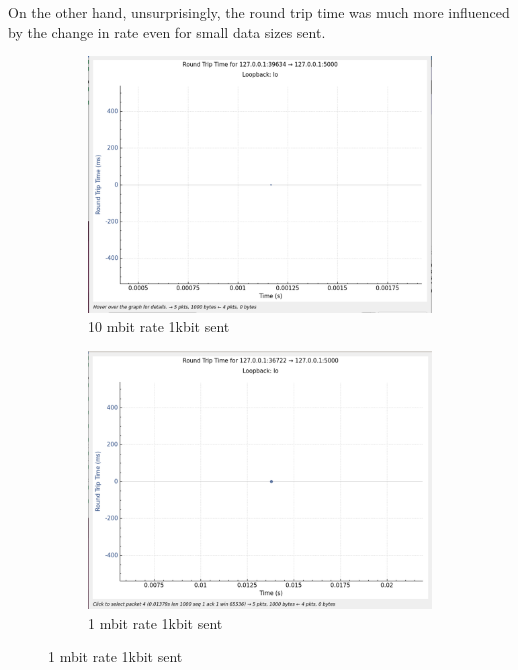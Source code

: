 \documentclass{report}
\begin{document}
On the other hand, unsurprisingly, the round trip time was much more influenced by the change in rate even for small data sizes sent.\\
\begin{figure}[H]
    \centering
    \begin{subfigure}[b]{0.45\textwidth}
        \centering
        \includegraphics[width=\textwidth]{Pics/Cubic/r10mbit_s1000_rtt}
        \caption{10 mbit rate 1kbit sent}
    \end{subfigure}
    \hfill
    \begin{subfigure}[b]{0.45\textwidth}
        \centering
        \includegraphics[width=\textwidth]{Pics/Cubic/r1mbit_s1000_rtt}
        \caption{1 mbit rate 1kbit sent}
    \end{subfigure}
    \medskip


\end{figure}
\end{document}
